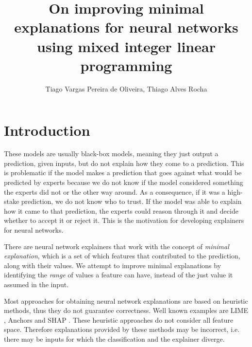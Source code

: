 \documentclass[12pt]{article}
\title{On improving minimal explanations for neural networks using mixed integer linear programming}
\author{Tiago Vargas Pereira de Oliveira\inst{1}, Thiago Alves Rocha\inst{1}}
\begin{document}
\maketitle

\begin{abstract}
\end{abstract}

\section{Introduction}


These models are usually black-box models, meaning they just output a prediction, given inputs, but do not explain how they come to a prediction.
This is problematic if the model makes a prediction that goes against what would be predicted by experts because we do not know if the model considered something the experts did not or the other way around.
As a consequence, if it was a high-stake prediction, we do not know who to trust.
If the model was able to explain how it came to that prediction, the experts could reason through it and decide whether to accept it or reject it.
This is the motivation for developing explainers for neural networks.



There are neural network explainers that work with the concept of \emph{minimal explanation}, which is a set of which features that contributed to the prediction, along with their values.
We attempt to improve minimal explanations by identifying the \emph{range} of values a feature can have, instead of the just value it assumed in the input.


Most approaches for obtaining neural network explanations are based on heuristic methods, thus they do not guarantee correctness.
Well known examples are LIME \cite{ribeiro2016should}, Anchors \cite{Ribeiro_Singh_Guestrin_2018} and SHAP \cite{lundberg2017unified}.
These heuristic approaches do not consider all feature space. Therefore explanations provided by these methods may be incorrect, i.e. there may be inputs for which the classification and the explainer diverge.
\end{document}

